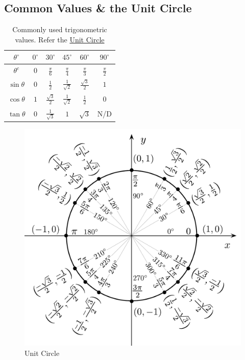 \documentclass[12pt]{article}
\begin{document}
\subsection{Common Values \& the Unit Circle}
\begin{table}[H]
	\centering
	\renewcommand{\arraystretch}{1.5}
	\begin{tabular}{cccccc}
		\toprule
		$\theta ^ \circ$ & $0^ \circ$ & $30^ \circ$ & $45^ \circ$ & $60^ \circ$ & $90^ \circ$ \\ \midrule
		$\theta ^ c$ & $0$ & $\frac{\pi}{6}$ & $\frac{\pi}{4}$ & $\frac{\pi}{3}$ & $\frac{\pi}{2}$ \\ \midrule
		$\sin \theta$ & $0$ & $\frac{1}{2}$ & $\frac{1}{\sqrt{2}}$ & $\frac{\sqrt{3}}{2}$ & $1$ \\
		$\cos \theta$ & $1$ & $\frac{\sqrt{3}}{2}$ & $\frac{1}{\sqrt{2}}$ & $\frac{1}{2}$ & $0$ \\
		$\tan \theta$ & 0 & $\frac{1}{\sqrt{3}}$ & $1$ & $\sqrt{3}$ & N/D \\ \bottomrule
	\end{tabular}
	\caption{\label{standardvals}Commonly used trigonometric values. Refer the \hyperref[unitcircle]{Unit Circle}}
\end{table}
\begin{figure}[ht]
	\centering
	\includegraphics[scale=0.8]{Unit_circle_angles.pdf}
	\caption{\label{unitcircle} Unit Circle}
\end{figure}
\end{document}
